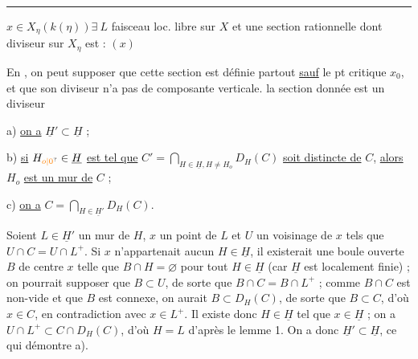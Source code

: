 \noindent\rule{2cm}{.4pt}

$x\in X_{\eta}(k(\eta))$\quad $\exists\ L$ faisceau loc. libre sur $X$ et une section rationnelle dont  diviseur sur $X_{\eta}$ est  : $(x)$

En , on peut supposer que cette section est définie partout \uline{sauf}   le pt critique $x_0$, et que  son diviseur n'a pas de composante verticale.    la section donnée est un diviseur


a) \uline{on a} $\underline H'\subset\underline H$ ;

b) \uline{si} $H_{\unsure{o|0}}\in\underline H$ \uline{est tel que} $C'=\displaystyle\bigcap_{H\in\underline H,H\ne H_o}D_H(C)$ \uline{soit distincte de} $C$, \uline{alors} $H_o$ \uline{est un mur de} $C$ ;

c) \uline{on a} $C=\displaystyle\bigcap_{H\in\underline H'}D_H(C)$.

Soient $L\in\underline H'$ un mur de $H$, $x$ un point de $L$ et $U$ un voisinage de $x$ tels que $U\cap C=U\cap L^+$. Si $x$ n'appartenait  aucun $H\in\underline H$, il existerait une boule ouverte $B$ de centre $x$ telle que $B\cap H=\varnothing$ pour tout $H\in\underline H$ (car $\underline H$ est localement finie) ; on pourrait supposer que $B\subset U$, de sorte que $B\cap C=B\cap L^+$ ; comme $B\cap C$ est non-vide et que $B$ est connexe, on aurait $B\subset D_H(C)$, de sorte que $B\subset C$, d'où $x\in C$, en contradiction avec $x\in L^+$. Il existe donc $H\in\underline H$ tel que $x\in\underline H$ ; on a $U\cap L^+\subset C\cap D_H(C)$, d'où $H=L$ d'après le lemme 1. On a donc $\underline H'\subset\underline H$, ce qui démontre a).

